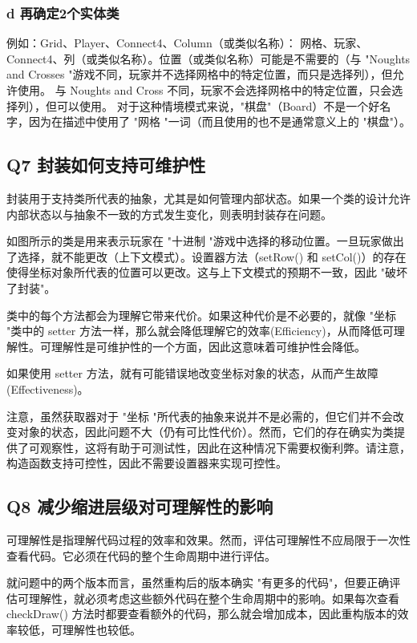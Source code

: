 \subsubsection{d 再确定2个实体类}

例如：Grid、Player、Connect4、Column（或类似名称）： 网格、玩家、Connect4、列（或类似名称）。位置（或类似名称）可能是不需要的（与 "Noughts and Crosses "游戏不同，玩家并不选择网格中的特定位置，而只是选择列），但允许使用。
与 Noughts and Cross 不同，玩家不会选择网格中的特定位置，只会选择列），但可以使用。
对于这种情境模式来说，"棋盘"（Board）不是一个好名字，因为在描述中使用了 "网格 "一词（而且使用的也不是通常意义上的 "棋盘"）。


\subsection{Q7 封装如何支持可维护性}
封装用于支持类所代表的抽象，尤其是如何管理内部状态。如果一个类的设计允许内部状态以与抽象不一致的方式发生变化，则表明封装存在问题。

如图所示的类是用来表示玩家在 "十进制 "游戏中选择的移动位置。一旦玩家做出了选择，就不能更改（上下文模式）。设置器方法（setRow() 和 setCol()）的存在使得坐标对象所代表的位置可以更改。这与上下文模式的预期不一致，因此 "破坏了封装"。

类中的每个方法都会为理解它带来代价。如果这种代价是不必要的，就像 "坐标 "类中的 setter 方法一样，那么就会降低理解它的效率(Efficiency)，从而降低可理解性。可理解性是可维护性的一个方面，因此这意味着可维护性会降低。

如果使用 setter 方法，就有可能错误地改变坐标对象的状态，从而产生故障(Effectiveness)。

注意，虽然获取器对于 "坐标 "所代表的抽象来说并不是必需的，但它们并不会改变对象的状态，因此问题不大（仍有可比性代价）。然而，它们的存在确实为类提供了可观察性，这将有助于可测试性，因此在这种情况下需要权衡利弊。请注意，构造函数支持可控性，因此不需要设置器来实现可控性。

\subsection{Q8 减少缩进层级对可理解性的影响}

可理解性是指理解代码过程的效率和效果。然而，评估可理解性不应局限于一次性查看代码。它必须在代码的整个生命周期中进行评估。

就问题中的两个版本而言，虽然重构后的版本确实 "有更多的代码"，但要正确评估可理解性，就必须考虑这些额外代码在整个生命周期中的影响。如果每次查看 checkDraw() 方法时都要查看额外的代码，那么就会增加成本，因此重构版本的效率较低，可理解性也较低。

